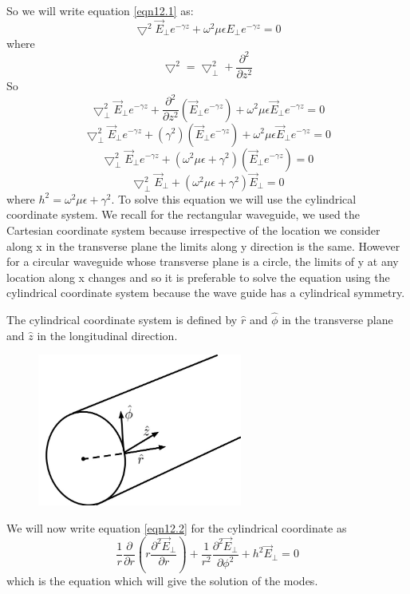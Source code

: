 So we will write equation \ref{eqn12.1} as:
\[\bigtriangledown^2\vec{E}_\perp e^{-\gamma z} + \omega^2 \mu\epsilon E_\perp e^{-\gamma z} = 0\]
where \[\bigtriangledown^2 = \bigtriangledown^2_\perp + \frac{\partial^2}{\partial z^2}\]
So 
\[\bigtriangledown^2_\perp\vec{E}_\perp e^{-\gamma z} + \frac{\partial^2}{\partial z^2}\left(\vec{E}_\perp e^{-\gamma z}\right) + \omega^2\mu\epsilon\vec{E}_\perp e^{-\gamma z} = 0\]
\[\bigtriangledown^2_\perp\vec{E}_\perp e^{-\gamma z} + (\gamma^2)\left(\vec{E}_\perp e^{-\gamma z}\right) + \omega^2\mu\epsilon\vec{E}_\perp e^{-\gamma z} = 0\]
\[\bigtriangledown^2_\perp\vec{E}_\perp e^{-\gamma z} + (\omega^2\mu\epsilon + \gamma^2)\left(\vec{E}_\perp e^{-\gamma z}\right) = 0\]
\begin{equation}
\bigtriangledown^2_\perp\vec{E}_\perp + (\omega^2\mu\epsilon + \gamma^2)\vec{E}_\perp = 0
\label{eqn12.2}
\end{equation}
where $h^2 = \omega^2\mu\epsilon + \gamma^2$. To solve this equation we will use the cylindrical coordinate system. We recall for the rectangular waveguide, we used the Cartesian coordinate system because irrespective of the location we consider along x in the transverse plane the limits along y direction is the same. However for a circular waveguide whose transverse plane is a circle, the limits of y at any location along x changes and so it is preferable to solve the equation using the cylindrical coordinate system because the wave guide has a cylindrical symmetry.
 
The cylindrical coordinate system is defined by $\hat{r}$ and $\hat{\phi}$ in the transverse plane and $\hat{z}$ in the longitudinal direction.
\begin{figure}[h]
\centering
\includegraphics[height=5cm]{./graphics/fig_4.1}
\caption{}
\label{fig:fig4}
\end{figure}
 We will now write equation \ref{eqn12.2} for the cylindrical coordinate as 
 $$
 \frac{1}{r}\frac{\partial}{\partial r}(r\frac{\partial^2\vec{E}_\bot}{\partial r}) + \frac{1}{r^2}\frac{\partial^2\vec{E}_\bot}{\partial\phi^2}+ h^2\vec{E}_\bot = 0 
 $$
 which is the equation which will give the solution of the modes. 

